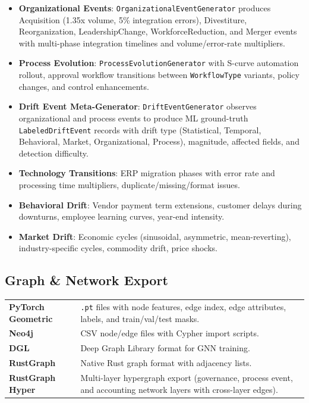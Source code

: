 \documentclass[11pt,a4paper]{article}
\begin{document}
\begin{itemize}[leftmargin=1.4em, itemsep=2pt]
  \item \textbf{Organizational Events}: \texttt{OrganizationalEventGenerator} produces Acquisition (1.35x volume, 5\% integration errors), Divestiture, Reorganization, LeadershipChange, WorkforceReduction, and Merger events with multi-phase integration timelines and volume/error-rate multipliers.
  \item \textbf{Process Evolution}: \texttt{ProcessEvolutionGenerator} with S-curve automation rollout, approval workflow transitions between \texttt{WorkflowType} variants, policy changes, and control enhancements.
  \item \textbf{Drift Event Meta-Generator}: \texttt{DriftEventGenerator} observes organizational and process events to produce ML ground-truth \texttt{LabeledDriftEvent} records with drift type (Statistical, Temporal, Behavioral, Market, Organizational, Process), magnitude, affected fields, and detection difficulty.
  \item \textbf{Technology Transitions}: ERP migration phases with error rate and processing time multipliers, duplicate/missing/format issues.
  \item \textbf{Behavioral Drift}: Vendor payment term extensions, customer delays during downturns, employee learning curves, year-end intensity.
  \item \textbf{Market Drift}: Economic cycles (sinusoidal, asymmetric, mean-reverting), industry-specific cycles, commodity drift, price shocks.
\end{itemize}

\subsection{Graph \& Network Export}

\begin{tcolorbox}[keybox={Supported Graph Formats}]
\begin{tabularx}{\textwidth}{>{\bfseries}l X}
  PyTorch Geometric & \texttt{.pt} files with node features, edge index,
                      edge attributes, labels, and train/val/test masks. \\[4pt]
  Neo4j             & CSV node/edge files with Cypher import scripts. \\[4pt]
  DGL               & Deep Graph Library format for GNN training. \\[4pt]
  RustGraph         & Native Rust graph format with adjacency lists. \\[4pt]
  RustGraph Hyper   & Multi-layer hypergraph export (governance, process event,
                      and accounting network layers with cross-layer edges).
\end{tabularx}
\end{tcolorbox}
\end{document}
